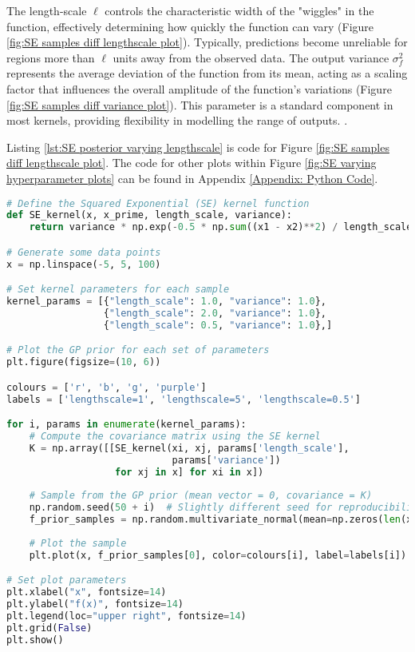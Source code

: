 \documentclass[12pt,a4paper]{article}
\begin{document}
The length-scale \( \ell \) controls the characteristic width of the "wiggles" in the function, effectively determining how quickly the function can vary (Figure \ref{fig:SE samples diff lengthscale plot}). Typically, predictions become unreliable for regions more than \( \ell \) units away from the observed data. The output variance \( \sigma_f^2 \) represents the average deviation of the function from its mean, acting as a scaling factor that influences the overall amplitude of the function's variations (Figure \ref{fig:SE samples diff variance plot}). This parameter is a standard component in most kernels, providing flexibility in modelling the range of outputs. \citep{torontoKernelCookbook}.

Listing \ref{lst:SE posterior varying lengthscale} is code for Figure \ref{fig:SE samples diff lengthscale plot}. The code for other plots within Figure \ref{fig:SE varying hyperparameter plots} can be found in Appendix \ref{Appendix: Python Code}.

\vspace{20pt}
\begin{lstlisting}[language=python, caption={Code of Figure \ref{fig:SE samples diff lengthscale plot.}}, label={lst:SE posterior varying lengthscale}]
# Define the Squared Exponential (SE) kernel function
def SE_kernel(x, x_prime, length_scale, variance):
    return variance * np.exp(-0.5 * np.sum((x1 - x2)**2) / length_scale**2)

# Generate some data points
x = np.linspace(-5, 5, 100) 

# Set kernel parameters for each sample
kernel_params = [{"length_scale": 1.0, "variance": 1.0},
                 {"length_scale": 2.0, "variance": 1.0},  
                 {"length_scale": 0.5, "variance": 1.0},]

# Plot the GP prior for each set of parameters
plt.figure(figsize=(10, 6))

colours = ['r', 'b', 'g', 'purple']
labels = ['lengthscale=1', 'lengthscale=5', 'lengthscale=0.5']

for i, params in enumerate(kernel_params):
    # Compute the covariance matrix using the SE kernel
    K = np.array([[SE_kernel(xi, xj, params['length_scale'],
                             params['variance'])     
                   for xj in x] for xi in x])
    
    # Sample from the GP prior (mean vector = 0, covariance = K)
    np.random.seed(50 + i)  # Slightly different seed for reproducibility
    f_prior_samples = np.random.multivariate_normal(mean=np.zeros(len(x)), cov=K, size=1)
    
    # Plot the sample
    plt.plot(x, f_prior_samples[0], color=colours[i], label=labels[i])

# Set plot parameters
plt.xlabel("x", fontsize=14)
plt.ylabel("f(x)", fontsize=14)
plt.legend(loc="upper right", fontsize=14)
plt.grid(False)
plt.show()
\end{lstlisting}
\end{document}
